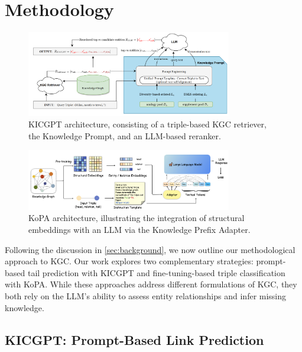\documentclass[12pt,a4paper]{article}
\begin{document}
%
%


\section{Methodology}\label{sec:methodology}

\begin{figure}
    \centering
    \includegraphics[width=0.8\textwidth]{figures/KICGPTarchitecture}
    \caption{KICGPT architecture, consisting of a triple-based KGC retriever, the Knowledge Prompt, and an LLM-based reranker.}
    \label{fig:KICGPTarchitecture}
\end{figure}

\begin{figure}
    \centering
    \includegraphics[width=0.8\textwidth]{figures/KoPAarchitecture}
    \caption{KoPA architecture, illustrating the integration of structural embeddings with an LLM via the Knowledge Prefix Adapter.}
    \label{fig:KoPAarchitecture}
\end{figure}

Following the discussion in \cref{sec:background}, we now outline our methodological approach to KGC.
Our work explores two complementary strategies: prompt-based tail prediction with KICGPT and fine-tuning-based triple classification with KoPA.
While these approaches address different formulations of KGC, they both rely on the LLM’s ability to assess entity relationships and infer missing knowledge.


\subsection{KICGPT: Prompt-Based Link Prediction}
\label{sec:method:kicgpt}
\end{document}
